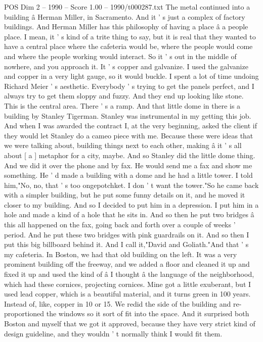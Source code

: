 \begin{textsample}{POS Dim 2 – 1990 – Score 1.00 – 1990/t000287.txt}
The metal continued into a building â Herman Miller, in Sacramento.
And it ' s just a complex of factory buildings.
And Herman Miller has this philosophy of having a place â a people place.
I mean, it ' s kind of a trite thing to say, but it is real that they wanted to have a central place where the cafeteria would be, where the people would come and where the people working would interact.
So it ' s out in the middle of nowhere, and you approach it.
It ' s copper and galvanize.
I used the galvanize and copper in a very light gauge, so it would buckle.
I spent a lot of time undoing Richard Meier ' s aesthetic.
Everybody ' s trying to get the panels perfect, and I always try to get them sloppy and fuzzy.
And they end up looking like stone.
This is the central area.
There ' s a ramp.
And that little dome in there is a building by Stanley Tigerman.
Stanley was instrumental in my getting this job.
And when I was awarded the contract I, at the very beginning, asked the client if they would let Stanley do a cameo piece with me.
Because these were ideas that we were talking about, building things next to each other, making â it ' s all about [ a ] metaphor for a city, maybe.
And so Stanley did the little dome thing.
And we did it over the phone and by fax.
He would send me a fax and show me something.
He ' d made a building with a dome and he had a little tower.
I told him,"No, no, that ' s too ongepotchket.
I don ' t want the tower."So he came back with a simpler building, but he put some funny details on it, and he moved it closer to my building.
And so I decided to put him in a depression.
I put him in a hole and made a kind of a hole that he sits in.
And so then he put two bridges â this all happened on the fax, going back and forth over a couple of weeks ' period.
And he put these two bridges with pink guardrails on it.
And so then I put this big billboard behind it.
And I call it,"David and Goliath."And that ' s my cafeteria.
In Boston, we had that old building on the left.
It was a very prominent building off the freeway, and we added a floor and cleaned it up and fixed it up and used the kind of â I thought â the language of the neighborhood, which had these cornices, projecting cornices.
Mine got a little exuberant, but I used lead copper, which is a beautiful material, and it turns green in 100 years.
Instead of, like, copper in 10 or 15.
We redid the side of the building and re-proportioned the windows so it sort of fit into the space.
And it surprised both Boston and myself that we got it approved, because they have very strict kind of design guideline, and they wouldn ' t normally think I would fit them.

\end{textsample}
